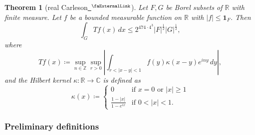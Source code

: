 \documentclass[12pt, reqno]{amsart}
\newcommand*{\complex}{\mathbb{C}} %
\newcommand*{\real}{\mathbb{R}} %
\newcommand{\extlink}{~\ensuremath{{}^\text{\faExternalLink}}}
\theoremstyle{definition}
\theoremstyle{plain}
\newtheorem{theorem}{Theorem}[subsection]
\begin{document}
\begin{theorem}[real Carleson\href{https://github.com/fpvandoorn/carleson/blob/AFM-frozen/Carleson/Classical/CarlesonOnTheRealLineContinuous.lean\#L29-L31}{\extlink}]\label{real-Carleson}
    Let $F,G$ be Borel subsets of $\real$ with finite measure. Let $f$ be a bounded measurable function on $\real$ with $|f|\le \mathbf{1}_F$. Then
\begin{equation*}
    \int _G Tf(x) \, dx \le 2^{474 \cdot 4^3} |F|^{\frac 12} |G|^{\frac 12},
\end{equation*}
where
\begin{equation*}
    T f(x)\coloneq\sup_{n\in \mathbb{Z}}
    \sup_{r>0}\left|\int_{r<|x-y|<1} f(y)\kappa(x-y) e^{iny}\, dy\right|,
\end{equation*}
and the \emph{Hilbert kernel} $\kappa\colon\real\to\complex$ is defined as
\begin{equation*}
    \kappa(x)\coloneq\begin{cases}
        0 & \text{if $x = 0$ or $|x| \ge 1$} \\
        \frac { 1-|x|}{1-e^{ix}} & \text{if $0 < |x| < 1$}.
    \end{cases}
\end{equation*}
\end{theorem}


\subsubsection{Preliminary definitions}\label{subsubsec:definitions}
\end{document}
